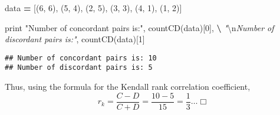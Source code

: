 \documentclass[
]{article}
\newenvironment{Shaded}{\begin{snugshade}}{\end{snugshade}}
\newcommand{\BuiltInTok}[1]{#1}
\newcommand{\CharTok}[1]{\textcolor[rgb]{0.31,0.60,0.02}{#1}}
\newcommand{\CommentTok}[1]{\textcolor[rgb]{0.56,0.35,0.01}{\textit{#1}}}
\newcommand{\DecValTok}[1]{\textcolor[rgb]{0.00,0.00,0.81}{#1}}
\newcommand{\NormalTok}[1]{#1}
\newcommand{\OperatorTok}[1]{\textcolor[rgb]{0.81,0.36,0.00}{\textbf{#1}}}
\newcommand{\StringTok}[1]{\textcolor[rgb]{0.31,0.60,0.02}{#1}}
\begin{document}
\newpage

\begin{Shaded}
\begin{Highlighting}[]
\NormalTok{data }\OperatorTok{=}\NormalTok{ [(}\DecValTok{6}\NormalTok{, }\DecValTok{6}\NormalTok{), (}\DecValTok{5}\NormalTok{, }\DecValTok{4}\NormalTok{), (}\DecValTok{2}\NormalTok{, }\DecValTok{5}\NormalTok{), (}\DecValTok{3}\NormalTok{, }\DecValTok{3}\NormalTok{), (}\DecValTok{4}\NormalTok{, }\DecValTok{1}\NormalTok{), (}\DecValTok{1}\NormalTok{, }\DecValTok{2}\NormalTok{)]}

\BuiltInTok{print} \StringTok{"Number of concordant pairs is:"}\NormalTok{, countCD(data)[}\DecValTok{0}\NormalTok{], }\OperatorTok{\textbackslash{}}
\CommentTok{"}\CharTok{\textbackslash{}n}\CommentTok{Number of discordant pairs is:"}\NormalTok{, countCD(data)[}\DecValTok{1}\NormalTok{]}
\end{Highlighting}
\end{Shaded}

\begin{verbatim}
## Number of concordant pairs is: 10 
## Number of discordant pairs is: 5
\end{verbatim}

Thus, using the formula for the Kendall rank correlation coefficient,
\[r_k = \frac{C - D}{C + D} = \frac{10 - 5}{15} = \frac{1}{3}\dots \Box\]
\end{document}
